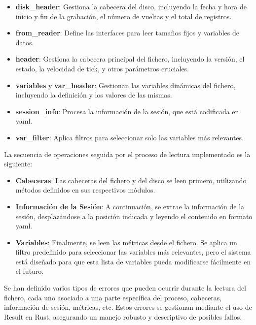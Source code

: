 \begin{itemize}
    \item \textbf{disk\_header}: Gestiona la cabecera del disco, incluyendo la fecha y hora de inicio y fin de la grabación, el número de vueltas y el total de registros.
    \item \textbf{from\_reader}: Define las interfaces para leer tamaños fijos y variables de datos.
    \item \textbf{header}: Gestiona la cabecera principal del fichero, incluyendo la versión, el estado, la velocidad de tick, y otros parámetros cruciales.
    \item \textbf{variables} y \textbf{var\_header}: Gestionan las variables dinámicas del fichero, incluyendo la definición y los valores de las mismas.
    \item \textbf{session\_info}: Procesa la información de la sesión, que está codificada en \ac{yaml}.
    \item \textbf{var\_filter}: Aplica filtros para seleccionar solo las variables más relevantes.
\end{itemize}

La secuencia de operaciones seguida por el proceso de lectura implementado es la siguiente:

\begin{itemize}
    \item \textbf{Cabeceras}: Las cabeceras del fichero y del disco se leen primero, utilizando métodos definidos en sus respectivos módulos.
    \item \textbf{Información de la Sesión}: A continuación, se extrae la información de la sesión, desplazándose a la posición indicada y leyendo el contenido en formato \ac{yaml}.
    \item \textbf{Variables}: Finalmente, se leen las métricas desde el fichero. Se aplica un filtro predefinido para seleccionar las variables más relevantes, pero el sistema está diseñado para que esta lista de variables pueda modificarse fácilmente en el futuro.
\end{itemize}

Se han definido varios tipos de errores que pueden ocurrir durante la lectura del fichero, cada uno asociado a una parte específica del proceso, cabeceras, información de sesión, métricas, etc. Estos errores se gestionan mediante el uso de Result en Rust, asegurando un manejo robusto y descriptivo de posibles fallos.

